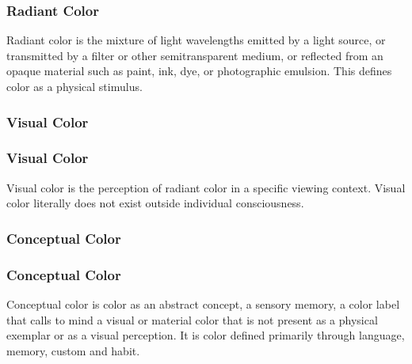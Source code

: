 \documentclass[12pt]{beamer}\usepackage[]{graphicx}\usepackage[]{color}
\begin{document}

\begin{frame}
\frametitle{Radiant Color}

Radiant color is the mixture of light wavelengths emitted by a light 
source, or transmitted by a filter or other semitransparent medium, or 
reflected from an opaque material such as paint, ink, dye, or photographic 
emulsion. This defines color as a physical stimulus.
\eb

{}

\end{frame}


\begin{frame}
\frametitle{Visual Color}
\begin{center}
\end{center}
\end{frame}


\begin{frame}
\frametitle{Visual Color}

Visual color is the perception of radiant color in a specific viewing 
context. Visual color literally does not exist outside individual consciousness.
\eb

{}

\end{frame}


\begin{frame}
\frametitle{Conceptual Color}
\begin{center}
\end{center}
\end{frame}


\begin{frame}
\frametitle{Conceptual Color}

Conceptual color is color as an abstract concept, a sensory memory, a color 
label that calls to mind a visual or material color that is not present as a 
physical exemplar or as a visual perception. It is color defined primarily 
through language, memory, custom and habit.
\eb

{}

\end{frame}
\end{document}
